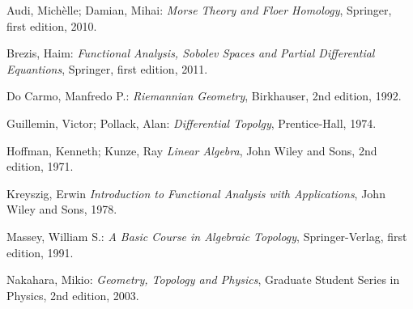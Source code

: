 \documentclass[12pt]{book}
\begin{document}
	\begin{thebibliography}{9}
		Audi, Michèlle; Damian, Mihai:
		\emph{Morse Theory and Floer Homology},
		Springer, first edition,
		2010.
		
		Brezis, Haim:
		\emph{Functional Analysis, Sobolev Spaces and Partial Differential Equantions},
		Springer, first edition,
		2011.
		
		Do Carmo, Manfredo P.:
		\emph{Riemannian Geometry},
		Birkhauser, 2nd edition,
		1992.
		
		Guillemin, Victor; Pollack, Alan:
		\emph{Differential Topolgy},
		Prentice-Hall,
		1974.	
	
		Hoffman, Kenneth; Kunze, Ray
		\emph{Linear Algebra},
		John Wiley and Sons, 2nd edition, 1971.
		
		Kreyszig, Erwin
		\emph{Introduction to Functional Analysis with Applications},
		John Wiley and Sons, 1978.
	
		Massey, William S.:
		\emph{A Basic Course in Algebraic Topology},
		Springer-Verlag, first edition,
		1991.
		
		Nakahara, Mikio:
		\emph{Geometry, Topology and Physics},
		Graduate Student Series in Physics, 2nd edition,
		2003.	
	\end{thebibliography}
	
\end{document}
